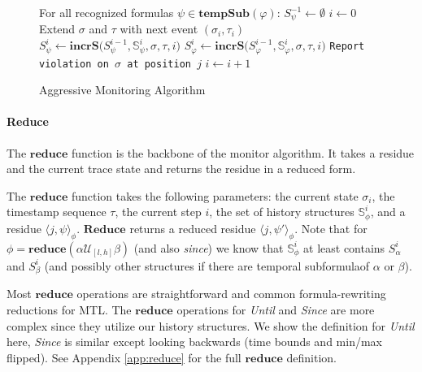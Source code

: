 \documentclass[]{../llncs/llncs}
\newcommand{\rp}[2]{\ensuremath{\langle #1, #2 \rangle}}
\newcommand{\rpt}[3]{\ensuremath{\langle #1, #2 \rangle}_{#3}}
\begin{document}
\begin{figure}
\begin{algorithmic}[1]
\STATE For all recognized formulas $\psi \in \mathbf{tempSub}(\varphi)$: $S^{-1}_{\psi} \leftarrow \emptyset$
\STATE $i \leftarrow 0$
\LOOP
\STATE Extend $\sigma$ and $\tau$ with next event $(\sigma_i,\tau_i)$
	\STATE $S^i_{\psi} \leftarrow \mathbf{incrS(} S^{i-1}_{\psi}, \mathbb{S}^i_{\psi}, \sigma, \tau, i)$
\ENDFOR
\STATE $S^i_{\varphi} \leftarrow \mathbf{incrS(} S^{i-1}_{\varphi}, \mathbb{S}^i_{\varphi}, \sigma, \tau, i)$
\FOR{all $\rp{j}{\bot} \in S^i_{\varphi}$}
\STATE \texttt{Report violation on $\sigma$ at position $j$}
\ENDFOR
\STATE $i \leftarrow i + 1$
\ENDLOOP
\end{algorithmic}
\caption{Aggressive Monitoring Algorithm}\label{fig:ag_algorithm}
\end{figure}



\paragraph{Reduce}
The $\mathbf{reduce}$ function is the backbone of the monitor algorithm. It takes a residue and the current trace state and returns the residue in a reduced form.

The $\mathbf{reduce}$ function takes the following parameters: the current state $\sigma_i$, the timestamp sequence $\tau$, the current step $i$, the set of history structures $\mathbb{S}^i_{\phi}$, and a residue $\rpt{j}{\psi}{\phi}$. $\mathbf{Reduce}$ returns a reduced residue $\rpt{j}{\psi'}{\phi}$. Note that for $\phi = \mathbf{reduce}(\alpha \mathcal{U}_{[l,h]} \beta)$ (and also \emph{since}) we know that $\mathbb{S}^i_\phi$ at least contains $S^i_\alpha$ and $S^i_\beta$ (and possibly other structures if there are temporal subformulaof $\alpha$ or $\beta$).

Most $\mathbf{reduce}$ operations are straightforward and common formula-rewriting reductions for MTL. The $\mathbf{reduce}$ operations for \emph{Until} and \emph{Since} are more complex since they utilize our history structures. We show the definition for \emph{Until} here, \emph{Since} is similar except looking backwards (time bounds and min/max flipped). See Appendix \ref{app:reduce} for the full $\mathbf{reduce}$ definition.
\end{document}
